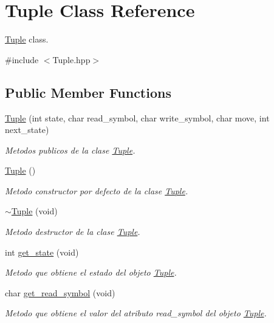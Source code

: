 \hypertarget{class_tuple}{}\section{Tuple Class Reference}
\label{class_tuple}


\hyperlink{class_tuple}{Tuple} class.  




{\ttfamily \#include $<$Tuple.\+hpp$>$}

\subsection*{Public Member Functions}
\begin{DoxyCompactItemize}
\item 
\hyperlink{class_tuple_ac77c891ea9cd8bdebeea6ad26002b9e6}{Tuple} (int state, char read\+\_\+symbol, char write\+\_\+symbol, char move, int next\+\_\+state)
\begin{DoxyCompactList}\small\item\em Metodos publicos de la clase \hyperlink{class_tuple}{Tuple}. \end{DoxyCompactList}\item 
\hypertarget{class_tuple_a07c616afb195cf694e8814318fbd2aa8}{}\label{class_tuple_a07c616afb195cf694e8814318fbd2aa8} 
\hyperlink{class_tuple_a07c616afb195cf694e8814318fbd2aa8}{Tuple} ()
\begin{DoxyCompactList}\small\item\em Metodo constructor por defecto de la clase \hyperlink{class_tuple}{Tuple}. \end{DoxyCompactList}\item 
\hyperlink{class_tuple_aad6937db049398362dd5242a17a46547}{$\sim$\+Tuple} (void)
\begin{DoxyCompactList}\small\item\em Metodo destructor de la clase \hyperlink{class_tuple}{Tuple}. \end{DoxyCompactList}\item 
int \hyperlink{class_tuple_abfc470f744b9f03a4934d19396d3fa7a}{get\+\_\+state} (void)
\begin{DoxyCompactList}\small\item\em Metodo que obtiene el estado del objeto \hyperlink{class_tuple}{Tuple}. \end{DoxyCompactList}\item 
char \hyperlink{class_tuple_a979cd76761b06c43531d3a7c8d7e34e8}{get\+\_\+read\+\_\+symbol} (void)
\begin{DoxyCompactList}\small\item\em Metodo que obtiene el valor del atributo \textquotesingle{}read\+\_\+symbol\textquotesingle{} del objeto \hyperlink{class_tuple}{Tuple}. \end{DoxyCompactList}\item 

\end{DoxyCompactItemize}
